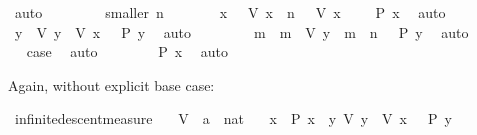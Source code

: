 \begin{isabellebody}
\ auto\isanewline
\ \ \isamarkupfalse%
\isanewline
\ \ \ \ \isamarkupfalse%
\ {\isacharparenleft}{\kern0pt}smaller\ n{\isacharparenright}{\kern0pt}\isanewline
\ \ \ \ \isamarkupfalse%
\ \isamarkupfalse%
\ x\ \ {\isacharasterisk}{\kern0pt}{\isacharcolon}{\kern0pt}\ {\isachardoublequoteopen}V\ x\ {\isacharequal}{\kern0pt}\ n\ {\isachardoublequoteclose}\ \ {\isachardoublequoteopen}V\ x\ {\isachargreater}{\kern0pt}\ {}\ {\isasymand}\ {\isasymnot}\ P\ x{\isachardoublequoteclose}\ \isamarkupfalse%
\ auto\isanewline
\ \ \ \ \isamarkupfalse%
\ {}\ \isamarkupfalse%
\ y\ \ {\isachardoublequoteopen}V\ y\ {\isacharless}{\kern0pt}\ V\ x\ {\isasymand}\ {\isasymnot}\ P\ y{\isachardoublequoteclose}\ \isamarkupfalse%
\ auto\isanewline
\ \ \ \ \isamarkupfalse%
\ {\isacharasterisk}{\kern0pt}\ \isamarkupfalse%
\ m\ \ {\isachardoublequoteopen}m\ {\isacharequal}{\kern0pt}\ V\ y\ {\isasymand}\ m\ {\isacharless}{\kern0pt}\ n\ {\isasymand}\ {\isasymnot}\ P\ y{\isachardoublequoteclose}\ \isamarkupfalse%
\ auto\isanewline
\ \ \ \ \isamarkupfalse%
\ \isamarkupfalse%
\ {\isacharquery}{\kern0pt}case\ \isamarkupfalse%
\ auto\isanewline
\ \ \isamarkupfalse%
\isanewline
\ \ \isamarkupfalse%
\ \isamarkupfalse%
\ {\isachardoublequoteopen}P\ x{\isachardoublequoteclose}\ \isamarkupfalse%
\ auto\isanewline
{}\isamarkupfalse%
%
\endisatagproof
{\isafoldproof}%
%
\isadelimproof
%
\endisadelimproof
%
\begin{isamarkuptext}%
Again, without explicit base case:%
\end{isamarkuptext}\isamarkuptrue%
\isamarkupfalse%
\ infinite{\isacharunderscore}{\kern0pt}descent{\isacharunderscore}{\kern0pt}measure{\isacharcolon}{\kern0pt}\isanewline
\ \ \ V\ {\isacharcolon}{\kern0pt}{\isacharcolon}{\kern0pt}\ {\isachardoublequoteopen}{\isacharprime}{\kern0pt}a\ {\isasymRightarrow}\ nat{\isachardoublequoteclose}\isanewline
\ \ \ {\isachardoublequoteopen}{\isasymAnd}x{\isachardot}{\kern0pt}\ {\isasymnot}\ P\ x\ {\isasymLongrightarrow}\ {\isasymexists}y{\isachardot}{\kern0pt}\ V\ y\ {\isacharless}{\kern0pt}\ V\ x\ {\isasymand}\ {\isasymnot}\ P\ y{\isachardoublequoteclose}\isanewline

\end{isabellebody}
